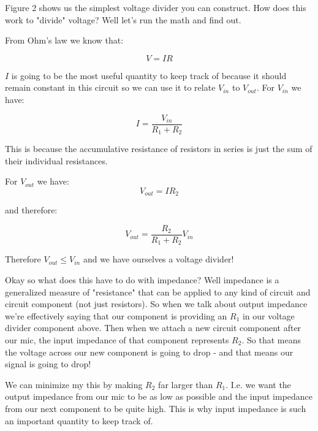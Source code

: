 \documentclass[10pt,a5paper]{book}
\begin{document}
Figure 2 shows us the simplest voltage divider you can construct. How does this work to "divide" voltage? Well let's run the math and find out. 

From Ohm's law we know that:

\begin{equation}
V = IR
\end{equation}

$I$ is going to be the most useful quantity to keep track of because it should remain constant in this circuit so we can use it to relate $V_{in}$ to $V_{out}$. For $V_{in}$ we have:

\begin{equation}
I = \frac{V_{in}}{R_1 + R_2}
\end{equation}

This is because the accumulative resistance of resistors in series is just the sum of their individual resistances. 

For $V_{out}$ we have:
\begin{equation}
V_{out} = IR_2
\end{equation}

and therefore:

\begin{equation}
V_{out}=\frac{R_2}{R_1 + R_2}V_{in}
\end{equation}

Therefore $V_{out} \leq V_{in}$ and we have ourselves a voltage divider! 

Okay so what does this have to do with impedance? Well impedance is a generalized measure of "resistance" that can be applied to any kind of circuit and circuit component (not just resistors). So when we talk about output impedance we're effectively saying that our component is providing an $R_1$ in our voltage divider component above. Then when we attach a new circuit component after our mic, the input impedance of that component represents $R_2$. So that means the voltage across our new component is going to drop - and that means our signal is going to drop! 

We can minimize my this by making $R_2$ far larger than $R_1$. I.e. we want the output impedance from our mic to be as low as possible and the input impedance from our next component to be quite high. This is why input impedance is such an important quantity to keep track of. 
\end{document}
